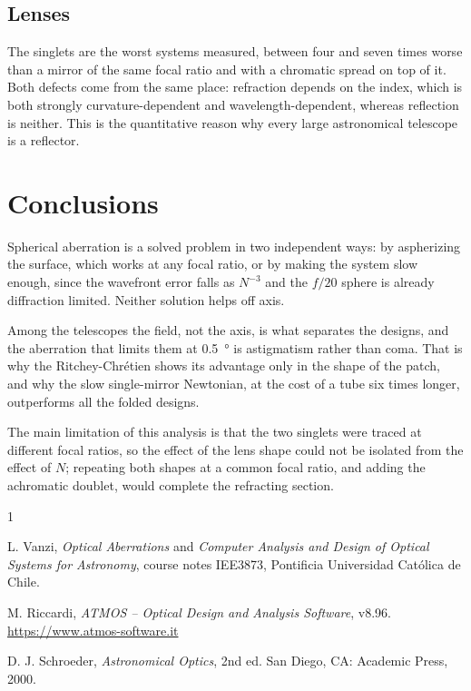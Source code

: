 \documentclass[conference]{IEEEtran}
\begin{document}
\subsection{Lenses}

The singlets are the worst systems measured, between four and seven times
worse than a mirror of the same focal ratio and with a chromatic spread on
top of it. Both defects come from the same place: refraction depends on the
index, which is both strongly curvature-dependent and wavelength-dependent,
whereas reflection is neither. This is the quantitative reason why every
large astronomical telescope is a reflector.

\section{Conclusions}
\label{sec:concl}

Spherical aberration is a solved problem in two independent ways: by
aspherizing the surface, which works at any focal ratio, or by making the
system slow enough, since the wavefront error falls as $N^{-3}$ and the
$f/20$ sphere is already diffraction limited. Neither solution helps off
axis.

Among the telescopes the field, not the axis, is what separates the designs,
and the aberration that limits them at \SI{0.5}{\degree} is astigmatism
rather than coma. That is why the Ritchey-Chr\'etien shows its advantage only
in the shape of the patch, and why the slow single-mirror Newtonian, at the
cost of a tube six times longer, outperforms all the folded designs.

The main limitation of this analysis is that the two singlets were traced at
different focal ratios, so the effect of the lens shape could not be isolated
from the effect of $N$; repeating both shapes at a common focal ratio, and
adding the achromatic doublet, would complete the refracting section.

\begin{thebibliography}{1}

L. Vanzi, \emph{Optical Aberrations} and \emph{Computer Analysis and Design of
Optical Systems for Astronomy}, course notes IEE3873, Pontificia Universidad
Cat\'olica de Chile.

M. Riccardi, \emph{ATMOS -- Optical Design and Analysis Software}, v8.96.
\url{https://www.atmos-software.it}

D. J. Schroeder, \emph{Astronomical Optics}, 2nd ed. San Diego, CA: Academic
Press, 2000.

\end{thebibliography}
\end{document}
